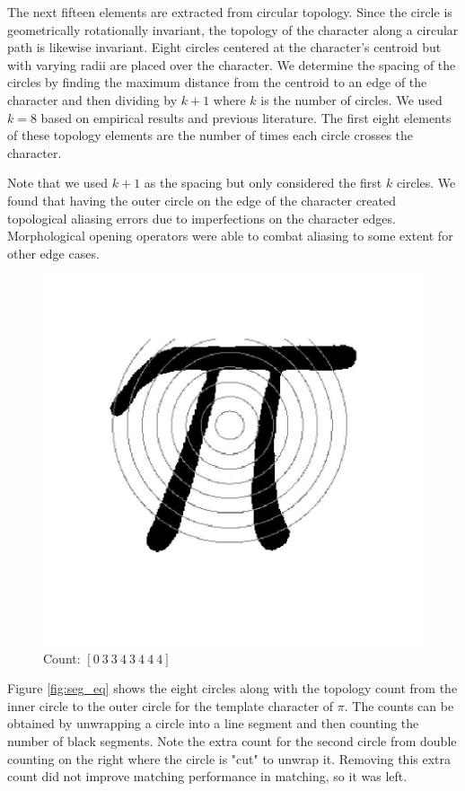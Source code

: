 \documentclass[journal]{IEEEtran}
\begin{document}
The next fifteen elements are extracted from circular topology. Since the circle is geometrically rotationally invariant, the topology of the character along a circular path is likewise invariant. Eight circles centered at the character’s centroid but with varying radii are placed over the character. We determine the spacing of the circles by finding the maximum distance from the centroid to an edge of the character and then dividing by $k+1$ where $k$ is the number of circles. We used $k=8$ based on empirical results and previous literature. The first eight elements of these topology elements are the number of times each circle crosses the character.

Note that we used $k+1$ as the spacing but only considered the first $k$ circles. We found that having the outer circle on the edge of the character created topological aliasing errors due to imperfections on the character edges. Morphological opening operators were able to combat aliasing to some extent for other edge cases.

\begin{figure}[!t]
    \centering
    \includegraphics[width=\columnwidth]{pi_hu}
    \caption{Count: $[0\ 3\ 3\ 4\ 3\ 4\ 4\ 4]$}
    \label{fig:pi_hu}
\end{figure}

Figure \ref{fig:seg_eq} shows the eight circles along with the topology count from the inner circle to the outer circle for the template character of $\pi$. The counts can be obtained by unwrapping a circle into a line segment and then counting the number of black segments. Note the extra count for the second circle from double counting on the right where the circle is "cut" to unwrap it. Removing this extra count did not improve matching performance in matching, so it was left.
\end{document}
